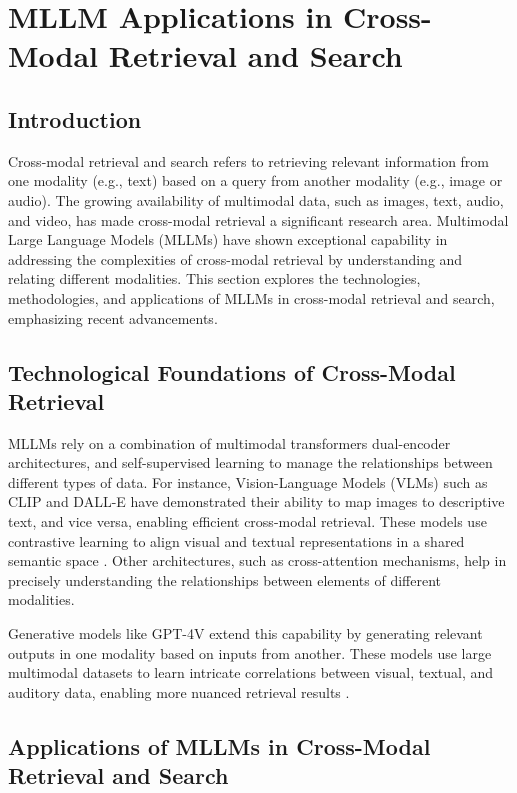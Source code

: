 \section{MLLM Applications in Cross-Modal Retrieval and Search}

\subsection{Introduction}

Cross-modal retrieval and search refers to retrieving relevant information from one modality (e.g., text) based on a query from another modality (e.g., image or audio). The growing availability of multimodal data, such as images, text, audio, and video, has made cross-modal retrieval a significant research area. Multimodal Large Language Models (MLLMs) have shown exceptional capability in addressing the complexities of cross-modal retrieval by understanding and relating different modalities. This section explores the technologies, methodologies, and applications of MLLMs in cross-modal retrieval and search, emphasizing recent advancements.

\subsection{Technological Foundations of Cross-Modal Retrieval}

MLLMs rely on a combination of multimodal transformers dual-encoder architectures, and self-supervised learning to manage the relationships between different types of data. For instance, Vision-Language Models (VLMs) such as CLIP and DALL-E have demonstrated their ability to map images to descriptive text, and vice versa, enabling efficient cross-modal retrieval. These models use contrastive learning to align visual and textual representations in a shared semantic space \cite{vs2024li,vs2015ranjan}. Other architectures, such as cross-attention mechanisms, help in precisely understanding the relationships between elements of different modalities.

Generative models like GPT-4V extend this capability by generating relevant outputs in one modality based on inputs from another. These models use large multimodal datasets to learn intricate correlations between visual, textual, and auditory data, enabling more nuanced retrieval results \cite{vs2024gomez}. 

\subsection{Applications of MLLMs in Cross-Modal Retrieval and Search}

